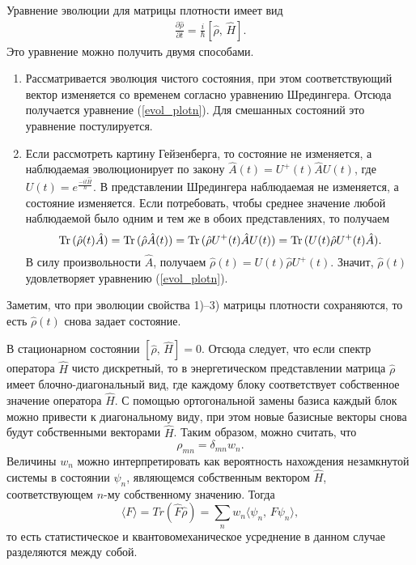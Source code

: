 \documentclass[a4paper
]{article}
\begin{document}
Уравнение эволюции для матрицы плотности имеет вид
\begin{align}
\label{evol_plotn}
\frac{\partial \hat \rho}{\partial t}=\frac{i}{\hbar}[\hat \rho, \, \hat H].
\end{align}
Это уравнение можно получить двумя способами.
\begin{enumerate}
\item Рассматривается эволюция чистого состояния, при этом соответствующий
вектор изменяется со временем согласно уравнению Шредингера. Отсюда
получается уравнение (\ref{evol_plotn}). Для смешанных состояний
это уравнение постулируется.
\item Если рассмотреть картину Гейзенберга, то состояние не изменяется,
а наблюдаемая эволюционирует по закону $\hat A(t)=U^+(t)\hat AU(t)$, где
$U(t)=e^{\frac{-it\hat H}{\hbar}}$. В представлении Шредингера наблюдаемая не изменяется,
а состояние изменяется. Если потребовать, чтобы среднее значение любой
наблюдаемой было одним и тем же в обоих представлениях, то получаем
$${\rm Tr}\, (\hat \rho(t)\hat A)={\rm Tr}\, (\hat \rho\hat A(t))=
{\rm Tr}\, (\hat \rho U^+(t)\hat AU(t))=
{\rm Tr}\, (U(t)\hat \rho U^+(t)\hat A).$$ В силу произвольности $\hat A$,
получаем $\hat \rho(t)=U(t)\hat \rho U^+(t)$. Значит, $\hat \rho(t)$
удовлетворяет уравнению (\ref{evol_plotn}).
\end{enumerate}
Заметим, что при эволюции свойства 1)--3) матрицы плотности сохраняются,
то есть $\hat \rho(t)$ снова задает состояние. \par
В стационарном состоянии $[\hat \rho, \, \hat H]=0$. Отсюда следует,
что если спектр оператора $\hat H$ чисто дискретный, то в энергетическом
представлении матрица $\hat \rho$ имеет блочно-диагональный вид, где
каждому блоку соответствует собственное значение оператора $\hat H$.
С помощью ортогональной замены базиса каждый блок можно привести к
диагональному виду, при этом новые базисные векторы снова будут
собственными векторами $\hat H$. Таким образом, можно считать,
что $$\rho_{mn}=\delta_{mn}w_n.$$ Величины $w_n$ можно интерпретировать как
вероятность нахождения незамкнутой системы в состоянии $\psi_n$,
являющемся собственным вектором $\hat H$, соответствующем
$n$-му собственному значению. Тогда
$$\langle F\rangle=Tr(\hat F\hat \rho)=\sum \limits_nw_n\langle \psi_n,
\, F\psi_n\rangle,$$ то есть статистическое и квантовомеханическое усреднение
в данном случае разделяются между собой.
\end{document}
